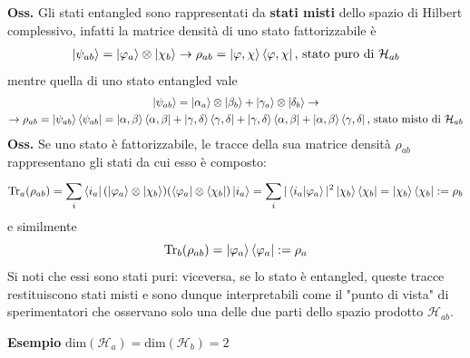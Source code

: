 \textbf{Oss.} Gli stati entangled sono rappresentati da \textbf{stati misti} dello
spazio di Hilbert complessivo, infatti la matrice densità di uno stato fattorizzabile è
\begin{gather*}
\ket{\psi_{ab}}=\ket{\varphi_a}\otimes\ket{\chi_b}\rightarrow\rho_{ab}=\ket{\varphi,\chi}
\bra{\varphi,\chi}\text{, stato puro di $\mathcal{H}_{ab}$}
\end{gather*}
mentre quella di uno stato entangled vale
\begin{gather*}
\ket{\psi_{ab}}=\ket{\alpha_a}\otimes\ket{\beta_b}+\ket{\gamma_a}\otimes\ket{\delta_b}\rightarrow\\
\rightarrow \rho_{ab}=\ket{\psi_{ab}}\bra{\psi_{ab}}=\ket{\alpha,\beta}\bra{\alpha,\beta}+
\ket{\gamma,\delta}\bra{\gamma,\delta}+\ket{\gamma,\delta}\bra{\alpha,\beta}+
\ket{\alpha,\beta}\bra{\gamma,\delta}\text{, stato misto di $\mathcal{H}_{ab}$}
\end{gather*}
\textbf{Oss.} Se uno stato è fattorizzabile, le tracce della sua matrice densità $\rho_{ab}$
rappresentano gli stati da cui esso è composto:
$$\Tr_a(\rho_{ab})=\sum_{i}^{}\bra{i_a}(\ket{\varphi_a}\otimes\ket{\chi_b})(\bra{\varphi_a}\otimes
\bra{\chi_b})\ket{i_a}=\sum_{i}^{}|\bra{i_a}\ket{\varphi_a}|^2\ket{\chi_b}\bra{\chi_b}=
\ket{\chi_b}\bra{\chi_b}:=\rho_b$$
e similmente
$$\Tr_b(\rho_{ab})=\ket{\varphi_a}\bra{\varphi_a}:=\rho_a$$
Si noti che essi sono stati puri: viceversa, se lo stato è entangled, queste tracce restituiscono
stati misti e sono dunque interpretabili come il "punto di vista" di sperimentatori
che osservano solo una delle due parti dello spazio prodotto $\mathcal{H}_{ab}$.

\textbf{Esempio} $\text{dim}(\mathcal{H}_a)=\text{dim}(\mathcal{H}_b)=2$

